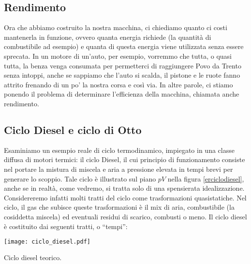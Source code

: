 \subsection{Rendimento}
Ora che abbiamo costruito la nostra macchina, ci chiediamo quanto ci
costi mantenerla in funzione, ovvero quanta energia richiede (la quantità
di combustibile ad esempio) e quanta di questa energia viene utilizzata
senza essere sprecata. In un motore di un'auto, per esempio, vorremmo che
tutta, o quasi tutta, la benza venga consumata per permetterci di raggiungere
Povo da Trento senza intoppi, anche se sappiamo che l'auto si scalda, il pistone
e le ruote fanno attrito frenando di un po' la nostra corsa e così via.
In altre parole, ci stiamo ponendo il problema
di determinare l'efficienza della macchina, chiamata anche rendimento.


\subsection{Ciclo Diesel e ciclo di Otto}
Esaminiamo un esempio reale di ciclo termodinamico, impiegato in
una classe diffusa di motori termici: il ciclo Diesel, il cui
principio di funzionamento consiste nel portare la mistura di
miscela e aria a pressione elevata in tempi brevi per generare
lo scoppio. Tale ciclo
è illustrato sul piano $pV$ nella figura \ref{erciclodiesel}, anche
se in realtà, come vedremo, si tratta solo di una spensierata idealizzazione.
Considereremo infatti molti tratti del ciclo come trasformazioni
quasistatiche. Nel ciclo, il gas che subisce queste trasformazioni
è il mix di aria, combustibile (la cosiddetta miscela) ed
eventuali residui di scarico, combusti o meno.
Il ciclo diesel è costituito dai seguenti tratti, o
``tempi'':

\begin{marginfigure}
    \centering
    \texttt{[image: ciclo\_diesel.pdf]}
    \caption{Ciclo diesel teorico.}
    \label{erciclodiesel}
\end{marginfigure}

